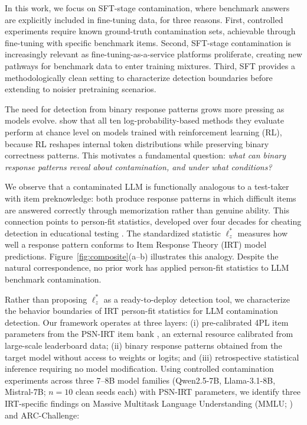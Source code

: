 In this work, we focus on SFT-stage contamination, where benchmark answers are explicitly included in fine-tuning data, for three reasons.
First, controlled experiments require known ground-truth contamination sets, achievable through fine-tuning with specific benchmark items.
Second, SFT-stage contamination is increasingly relevant as fine-tuning-as-a-service platforms proliferate, creating new pathways for benchmark data to enter training mixtures.
Third, SFT provides a methodologically clean setting to characterize detection boundaries before extending to noisier pretraining scenarios.

The need for detection from binary response patterns grows more pressing as models evolve.
\citet{wang2025fragility} show that all ten log-probability-based methods they evaluate perform at chance level on models trained with reinforcement learning (RL), because RL reshapes internal token distributions while preserving binary correctness patterns.
This motivates a fundamental question: \emph{what can binary response patterns reveal about contamination, and under what conditions?}

We observe that a contaminated LLM is functionally analogous to a test-taker with item preknowledge: both produce response patterns in which difficult items are answered correctly through memorization rather than genuine ability.
This connection points to person-fit statistics, developed over four decades for cheating detection in educational testing \citep{drasgow1985, meijer2001, karabatsos2003, sinharay2017}.
The standardized statistic $\ell_z^*$ \citep{snijders2001} measures how well a response pattern conforms to Item Response Theory (IRT) model predictions.
Figure~\ref{fig:composite}(a--b) illustrates this analogy.
Despite the natural correspondence, no prior work has applied person-fit statistics to LLM benchmark contamination.

Rather than proposing $\ell_z^*$ as a ready-to-deploy detection tool, we characterize the behavior boundaries of IRT person-fit statistics for LLM contamination detection.
Our framework operates at three layers: (i) pre-calibrated 4PL item parameters from the PSN-IRT item bank \citep{psnirt2026}, an external resource calibrated from large-scale leaderboard data; (ii) binary response patterns obtained from the target model without access to weights or logits; and (iii) retrospective statistical inference requiring no model modification.
Using controlled contamination experiments across three 7--8B model families (Qwen2.5-7B, Llama-3.1-8B, Mistral-7B; $n{=}10$ clean seeds each) with PSN-IRT parameters, we identify three IRT-specific findings on Massive Multitask Language Understanding (MMLU; \citealp{hendrycks2021mmlu}) and ARC-Challenge:

